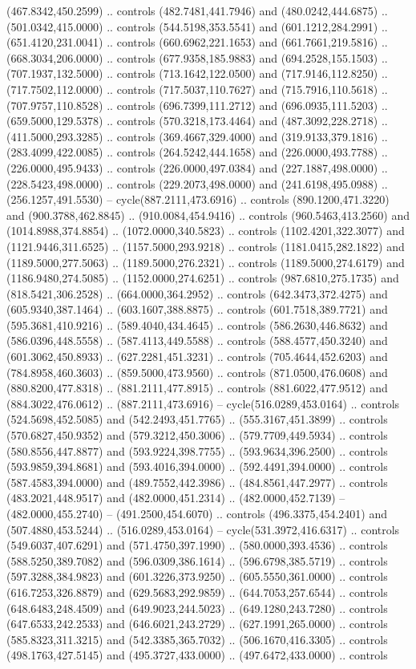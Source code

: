 (467.8342,450.2599) .. controls (482.7481,441.7946) and (480.0242,444.6875) .. (501.0342,415.0000) .. controls (544.5198,353.5541) and (601.1212,284.2991) .. (651.4120,231.0041) .. controls (660.6962,221.1653) and (661.7661,219.5816) .. (668.3034,206.0000) .. controls (677.9358,185.9883) and (694.2528,155.1503) .. (707.1937,132.5000) .. controls (713.1642,122.0500) and (717.9146,112.8250) .. (717.7502,112.0000) .. controls (717.5037,110.7627) and (715.7916,110.5618) .. (707.9757,110.8528) .. controls (696.7399,111.2712) and (696.0935,111.5203) .. (659.5000,129.5378) .. controls (570.3218,173.4464) and (487.3092,228.2718) .. (411.5000,293.3285) .. controls (369.4667,329.4000) and (319.9133,379.1816) .. (283.4099,422.0085) .. controls (264.5242,444.1658) and (226.0000,493.7788) .. (226.0000,495.9433) .. controls (226.0000,497.0384) and (227.1887,498.0000) .. (228.5423,498.0000) .. controls (229.2073,498.0000) and (241.6198,495.0988) .. (256.1257,491.5530) -- cycle(887.2111,473.6916) .. controls (890.1200,471.3220) and (900.3788,462.8845) .. (910.0084,454.9416) .. controls (960.5463,413.2560) and (1014.8988,374.8854) .. (1072.0000,340.5823) .. controls (1102.4201,322.3077) and (1121.9446,311.6525) .. (1157.5000,293.9218) .. controls (1181.0415,282.1822) and (1189.5000,277.5063) .. (1189.5000,276.2321) .. controls (1189.5000,274.6179) and (1186.9480,274.5085) .. (1152.0000,274.6251) .. controls (987.6810,275.1735) and (818.5421,306.2528) .. (664.0000,364.2952) .. controls (642.3473,372.4275) and (605.9340,387.1464) .. (603.1607,388.8875) .. controls (601.7518,389.7721) and (595.3681,410.9216) .. (589.4040,434.4645) .. controls (586.2630,446.8632) and (586.0396,448.5558) .. (587.4113,449.5588) .. controls (588.4577,450.3240) and (601.3062,450.8933) .. (627.2281,451.3231) .. controls (705.4644,452.6203) and (784.8958,460.3603) .. (859.5000,473.9560) .. controls (871.0500,476.0608) and (880.8200,477.8318) .. (881.2111,477.8915) .. controls (881.6022,477.9512) and (884.3022,476.0612) .. (887.2111,473.6916) -- cycle(516.0289,453.0164) .. controls (524.5698,452.5085) and (542.2493,451.7765) .. (555.3167,451.3899) .. controls (570.6827,450.9352) and (579.3212,450.3006) .. (579.7709,449.5934) .. controls (580.8556,447.8877) and (593.9224,398.7755) .. (593.9634,396.2500) .. controls (593.9859,394.8681) and (593.4016,394.0000) .. (592.4491,394.0000) .. controls (587.4583,394.0000) and (489.7552,442.3986) .. (484.8561,447.2977) .. controls (483.2021,448.9517) and (482.0000,451.2314) .. (482.0000,452.7139) -- (482.0000,455.2740) -- (491.2500,454.6070) .. controls (496.3375,454.2401) and (507.4880,453.5244) .. (516.0289,453.0164) -- cycle(531.3972,416.6317) .. controls (549.6037,407.6291) and (571.4750,397.1990) .. (580.0000,393.4536) .. controls (588.5250,389.7082) and (596.0309,386.1614) .. (596.6798,385.5719) .. controls (597.3288,384.9823) and (601.3226,373.9250) .. (605.5550,361.0000) .. controls (616.7253,326.8879) and (629.5683,292.9859) .. (644.7053,257.6544) .. controls (648.6483,248.4509) and (649.9023,244.5023) .. (649.1280,243.7280) .. controls (647.6533,242.2533) and (646.6021,243.2729) .. (627.1991,265.0000) .. controls (585.8323,311.3215) and (542.3385,365.7032) .. (506.1670,416.3305) .. controls (498.1763,427.5145) and (495.3727,433.0000) .. (497.6472,433.0000) .. controls 